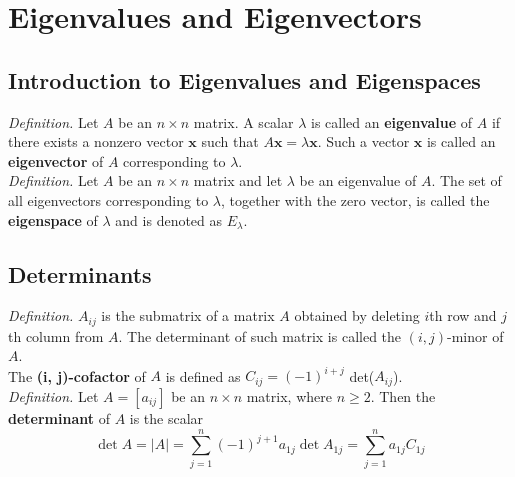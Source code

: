 \setcounter{chapter}{3}

\chapter{Eigenvalues and Eigenvectors}
\section{Introduction to Eigenvalues and Eigenspaces}

\textit{Definition.} Let $A$ be an $n \times n$ matrix. A scalar $\lambda$ is called an \textbf{eigenvalue} of $A$ if there exists a nonzero vector $\textbf{x}$ such that $A\textbf{x} = \lambda\textbf{x}$. Such a vector $\textbf{x}$ is called an \textbf{eigenvector} of $A$ corresponding to $\lambda$. \\

\textit{Definition.} Let $A$ be an $n \times n$ matrix and let $\lambda$ be an eigenvalue of $A$. The set of all eigenvectors corresponding to $\lambda$, together with the zero vector, is called the \textbf{eigenspace} of $\lambda$ and is denoted as $E_{\lambda}$.

\section{Determinants}

\textit{Definition.} $A_{ij}$ is the submatrix of a matrix $A$ obtained by deleting $i$th row and $j$th column from $A$. The determinant of such matrix is called the $(i, j)$-minor of $A$. 
\\ The \textbf{(i, j)-cofactor} of $A$ is defined as $C_{ij} = (-1)^{i+j}$ det($A_{ij}$). \\

\textit{Definition.} Let $A = [a_{ij}]$ be an $n \times n$ matrix, where $n \ge 2$. Then the \textbf{determinant} of $A$ is the scalar
\begin{equation*}
	\det A = \vert A \vert = \sum_{j=1}^{n}(-1)^{j+1}a_{1j} \det A_{1j} = \sum_{j=1}^{n}a_{1j}C_{1j}
\end{equation*}

